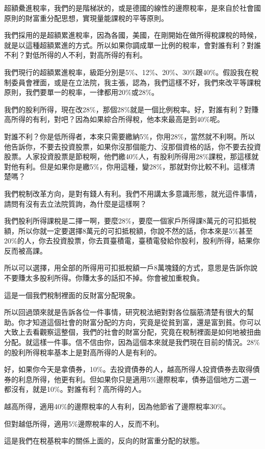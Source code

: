 \documentclass[]{ctexbook}
\begin{document}
超額纍進稅率，我們的是階梯狀的，或是德國的線性的邊際稅率，是來自於社會國原則的財富重分配思想，實現量能課稅的平等原則。

我們採用的是超額累進稅率，因為各國，美國，在剛開始在做所得稅課稅的時候，就是以這種超額累進的方式。所以如果你調成單一比例的稅率，會對誰有利？對誰不利？對低所得的人不利，對高所得的有利。

我們現行的超額累進稅率，級距分別是5\%、12\%、20\%、30\%跟40\%。假設我在稅制委員會裡面，或是在立法院，我主張，認為，我們這樣不好，我們來改平等課稅原則，我們要單一的稅率，一律都用20\%或28\%。

我們的股利所得，現在改28\%，那個28\%就是一個比例稅率。好，對誰有利？對賺高所得的有利，對吧？因為如果綜合所得稅，他本來最高是到40\%呢。

對誰不利？你是低所得者，本來只需要繳納5\%，你用28\%，當然就不利啊。所以他告訴你，不要去投資股票，如果你沒那個能力、沒那個資格的話，你不要去投資股票。人家投資股票是節稅啊，他們繳40\%人，有股利所得用28\%課稅，那這樣就對他有利。但是如果你是繳5\%，你用這種，變28\%，那就對你比較不利。這樣清楚嗎？

我們稅制改革方向，是對有錢人有利。我們不用講太多意識形態，就光這件事情，請問有沒有去立法院質詢，為什麼是這樣啊？

我們股利所得課稅是二擇一啊，要麼28\%，要麼一個家戶所得課8萬元的可扣抵稅額，所以你就一定要選擇8萬元的可扣抵稅額，你說不然的話，你本來是5\%甚至20\%的人，你去投資股票，你去買臺積電，臺積電發給你股利，股利所得，結果你反而被高課。

所以可以選擇，用全部的所得用可扣抵稅額一戶8萬塊錢的方式，意思是告訴你說不要賺太多股利所得。你賺太多的話扣不掉。你會被加重稅負。

這是一個我們稅制裡面的反財富分配現象。

所以回過頭來就是告訴各位一件事情，研究稅法絕對對各位腦筋清楚有很大的幫助。你才知道這個社會的財富分配的方向，究竟是從貧到富，還是富到貧。你可以大致上去看觀察這整個，我們的社會的財富分配，究竟在稅制裡面是如何地被扭曲分配。就這樣一件事。信不信由你，因為這個本來就是我們現在目前的情況。28\%的股利所得稅率基本上是對高所得的人是有利的。

好，如果你今天是拿債券，10\%。去投資債券的人，越高所得人投資債券去取得債券的利息所得，他更有利。但如果你只是適用5\%邊際稅率，債券這個地方二選一都沒有，就是10\%。對誰有利？高所得的人。

越高所得，適用40\%的邊際稅率的人有利，因為他節省了邊際稅率30\%。

但對越低所得，適用5\%邊際稅率的人，反而不利。

這是我們在稅基稅率的關係上面的，反向的財富重分配的狀態。
\end{document}
